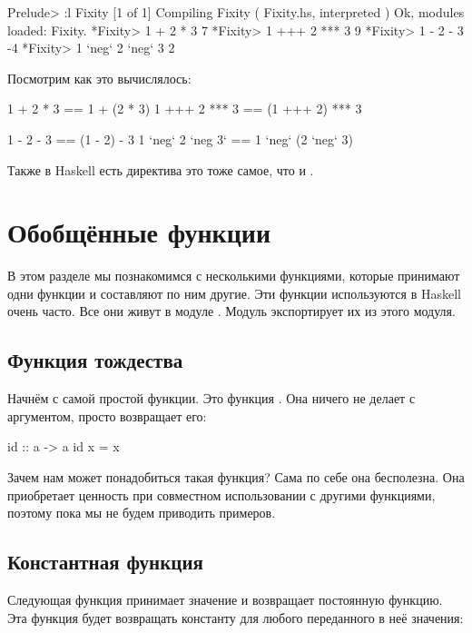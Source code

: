 \begin{code}
Prelude> :l Fixity
[1 of 1] Compiling Fixity           ( Fixity.hs, interpreted )
Ok, modules loaded: Fixity.
*Fixity> 1 + 2 * 3
7
*Fixity> 1 +++ 2 *** 3
9
*Fixity> 1 - 2 - 3
-4
*Fixity> 1 `neg` 2 `neg` 3
2
\end{code}

Посмотрим как это вычислялось:

\begin{code}
1   +   2   *  3  ==   1   +   (2    *   3)
1  +++  2  *** 3  ==  (1  +++   2)  ***  3

1   -   2   -  3  ==  (1   -    2)   -   3
1 `neg` 2 `neg 3` ==   1 `neg` (2  `neg` 3)
\end{code}

Также в Haskell есть директива  это тоже самое, что и
.


\section{Обобщённые функции}

В этом разделе мы познакомимся с несколькими функциями,
которые принимают одни функции и составляют по ним другие.
Эти функции используются в Haskell очень часто. 
Все они живут в модуле . Модуль 
экспортирует их из этого модуля. 

\subsection{Функция тождества}

Начнём с самой простой функции. Это функция .
Она ничего не делает с аргументом, просто возвращает его:

\begin{code}
id :: a -> a
id x = x
\end{code}

Зачем нам может понадобиться такая функция? Сама по себе
она бесполезна. Она приобретает ценность при совместном 
использовании с другими функциями, поэтому пока мы не будем 
приводить примеров.

\subsection{Константная функция}

Следующая функция  принимает значение и возвращает
постоянную функцию. Эта функция будет возвращать константу
для любого переданного в неё значения:

